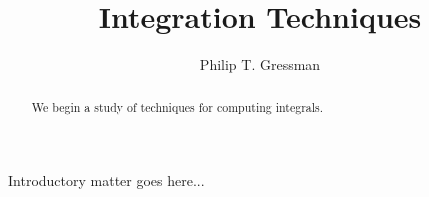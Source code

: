\documentclass{ximera}
\title{Integration Techniques}
\author{Philip T. Gressman}
\begin{document}
\begin{abstract}
We begin a study of techniques for computing integrals.
\end{abstract}
\maketitle

Introductory matter goes here...
\end{document}
